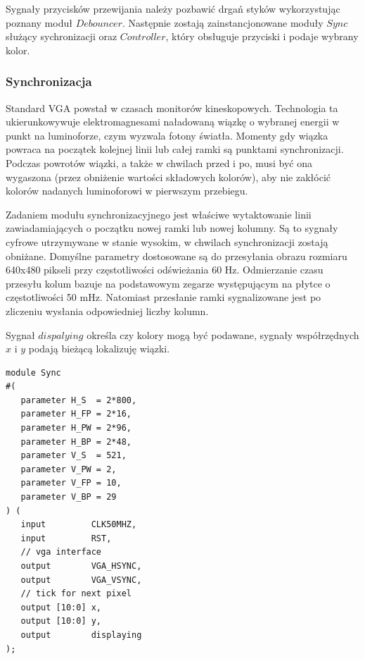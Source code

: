 \documentclass[a4paper,12pt]{article}
\begin{document}
Sygnały przycisków przewijania należy pozbawić drgań styków wykorzystując poznany moduł $Debouncer$. Następnie zostają zainstancjonowane moduły $Sync$ służący sychronizacji oraz $Controller$, który obsługuje przyciski i podaje wybrany kolor.

\subsubsection{Synchronizacja}
Standard VGA powstał w czasach monitorów kineskopowych. Technologia ta ukierunkowywuje elektromagnesami naładowaną wiązkę o wybranej energii w punkt na luminoforze, czym wyzwala fotony światła. Momenty gdy wiązka powraca na początek kolejnej linii lub całej ramki są punktami synchronizacji. Podczas powrotów wiązki, a także w chwilach przed i po, musi być ona wygaszona (przez obniżenie wartości składowych kolorów), aby nie zakłócić kolorów nadanych luminoforowi w pierwszym przebiegu.

Zadaniem modułu synchronizacyjnego jest właściwe wytaktowanie linii zawiadamiających o początku nowej ramki lub nowej kolumny. Są to sygnały cyfrowe utrzymywane w stanie wysokim, w chwilach synchronizacji zostają obniżane. Domyślne parametry dostosowane są do przesyłania obrazu rozmiaru 640x480 pikseli przy częstotliwości odświeżania 60 Hz. Odmierzanie czasu przesyłu kolum  bazuje na podstawowym zegarze występującym na płytce o częstotliwości 50 mHz. Natomiast przesłanie ramki sygnalizowane jest po zliczeniu wysłania odpowiedniej liczby kolumn.

Sygnał $dispalying$ określa czy kolory mogą być podawane, sygnały współrzędnych $x$ i $y$ podają bieżącą lokalizuję wiązki.

\begin{lstlisting}[label=Syncvga,caption=Sync.v]
module Sync
#(
   parameter H_S  = 2*800,
   parameter H_FP = 2*16,
   parameter H_PW = 2*96,
   parameter H_BP = 2*48,
   parameter V_S  = 521,
   parameter V_PW = 2,
   parameter V_FP = 10,
   parameter V_BP = 29
) (
   input         CLK50MHZ,
   input         RST,
   // vga interface
   output        VGA_HSYNC,
   output        VGA_VSYNC,
   // tick for next pixel
   output [10:0] x,
   output [10:0] y,
   output        displaying
);
\end{lstlisting}
\end{document}
